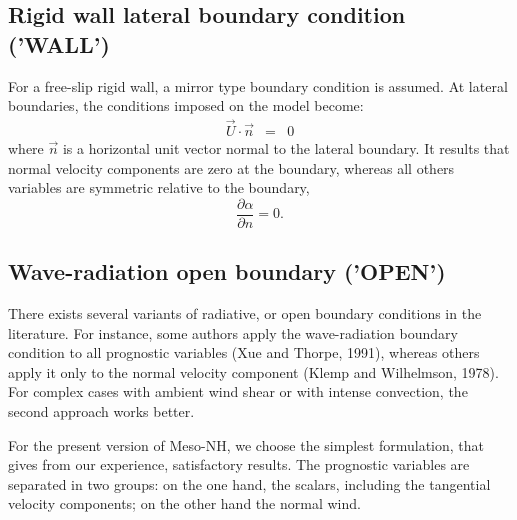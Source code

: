 \subsection{Rigid wall lateral boundary condition ('WALL')}

 For a free-slip rigid wall, a mirror type boundary condition is assumed.
At lateral boundaries, the conditions imposed on the model become:
\begin{eqnarray}
\vec{U}\cdot\vec{n}&=&0
\end{eqnarray}
where $\vec{n}$ is a horizontal unit vector normal to the lateral boundary.
 It results that normal velocity components are zero at the boundary,
whereas all others variables are symmetric relative to the boundary,
\begin{equation}
\dfrac{\partial \alpha }{\partial n }=0.
\end{equation}

\subsection{Wave-radiation open boundary ('OPEN')}

There exists several variants of radiative, or open boundary conditions
in the literature.  For instance, some authors apply the wave-radiation
boundary condition to all prognostic variables
(Xue and Thorpe, 1991), whereas others apply it only to the normal
velocity component (Klemp and Wilhelmson, 1978). For complex cases
with ambient wind shear or with intense convection, the second approach
works better.

For the present version of Meso-NH, we choose the simplest
formulation, that gives from our experience, satisfactory results.
The prognostic variables are separated in two groups: on the one hand, the
scalars, including the tangential velocity components; on the other hand
the normal wind.

